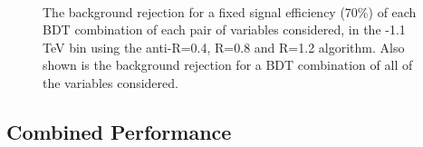 \begin{figure}
\centering
{}
\\
\caption{The background rejection
for a fixed signal efficiency (70\%) of each BDT combination of
each pair of variables considered, in the -1.1 TeV bin using
the anti-\kT R=0.4, R=0.8 and R=1.2 algorithm. Also shown is the background rejection
for a BDT combination of all of the variables considered.}
\label{fig:pt1000_comb2D}
\end{figure}


\subsection{Combined Performance}

